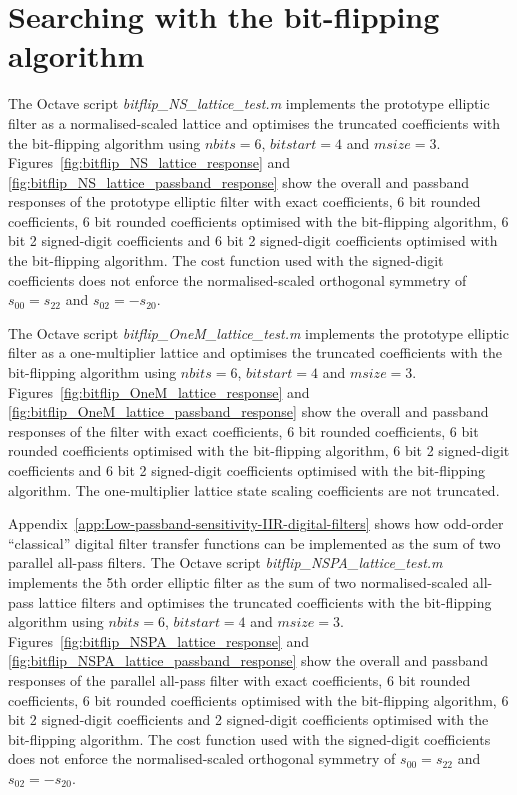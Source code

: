 \documentclass[a4paper,twoside,10pt,english]{report}
\begin{document}
\section{Searching with the bit-flipping algorithm\label{sec:Searching-with-the-bit-flipping-algorithm}}
The Octave script \emph{bitflip\_NS\_lattice\_test.m} implements the prototype
elliptic filter as a normalised-scaled lattice and optimises the truncated
coefficients with the bit-flipping algorithm using $nbits=6$, $bitstart=4$ and
$msize=3$. Figures~\ref{fig:bitflip_NS_lattice_response} and
\ref{fig:bitflip_NS_lattice_passband_response} show the overall and passband
responses of the prototype elliptic filter with exact coefficients, 
6 bit rounded coefficients, 6 bit rounded coefficients optimised with the 
bit-flipping algorithm, 6 bit 2 signed-digit coefficients and 6 bit 
2 signed-digit coefficients optimised with the bit-flipping algorithm. The cost 
function used with the signed-digit coefficients does not enforce the 
normalised-scaled orthogonal symmetry of $s_{00}=s_{22}$ and $s_{02}=-s_{20}$.

The Octave script \emph{bitflip\_OneM\_lattice\_test.m} implements the prototype
elliptic filter as a one-multiplier lattice and optimises the truncated
coefficients with the bit-flipping algorithm using $nbits=6$, $bitstart=4$ and
$msize=3$. Figures~\ref{fig:bitflip_OneM_lattice_response} and
\ref{fig:bitflip_OneM_lattice_passband_response} show the overall and passband
responses of the filter with exact coefficients, 6 bit rounded coefficients, 
6 bit rounded coefficients optimised with the bit-flipping algorithm, 6 bit 
2 signed-digit coefficients and 6 bit 2 signed-digit coefficients optimised
with the bit-flipping algorithm. The one-multiplier lattice state scaling
coefficients are not truncated.

Appendix~\ref{app:Low-passband-sensitivity-IIR-digital-filters} shows how
odd-order ``classical'' digital filter transfer functions can be implemented as
the sum of two parallel all-pass filters. The Octave script
\emph{bitflip\_NSPA\_lattice\_test.m} implements the 5th order elliptic filter
as the sum of two normalised-scaled all-pass lattice filters and optimises the
truncated coefficients with the bit-flipping algorithm using $nbits=6$, 
$bitstart=4$ and $msize=3$. Figures~\ref{fig:bitflip_NSPA_lattice_response} and 
\ref{fig:bitflip_NSPA_lattice_passband_response} show the overall and passband
responses of the parallel all-pass filter with exact coefficients, 6 bit
rounded coefficients, 6 bit rounded coefficients optimised with the bit-flipping
algorithm, 6 bit 2 signed-digit coefficients and 2 signed-digit coefficients 
optimised with the bit-flipping algorithm. The cost function used with the 
signed-digit coefficients does not enforce the normalised-scaled orthogonal
symmetry of $s_{00}=s_{22}$ and $s_{02}=-s_{20}$.
\end{document}
